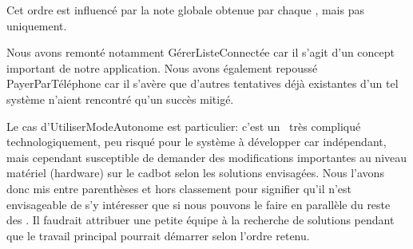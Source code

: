 Cet ordre est influencé par la note globale obtenue par chaque \cu, mais pas uniquement. 
\par
Nous avons remonté notamment GérerListeConnectée car il s'agit d'un concept important de notre application. 
Nous avons également repoussé PayerParTéléphone car il s'avère que d'autres tentatives déjà existantes d'un tel système n'aient rencontré qu'un succès mitigé.
\par
Le cas d'UtiliserModeAutonome est particulier: c'est un \cu\ très compliqué technologiquement, peu risqué pour le système à développer car indépendant, mais cependant susceptible de demander des modifications importantes au niveau matériel (hardware) sur le cadbot selon les solutions envisagées.
Nous l'avons donc mis entre parenthèses et hors classement pour signifier qu'il n'est envisageable de s'y intéresser que si nous pouvons le faire en parallèle du reste des \cu. 
Il faudrait attribuer une petite équipe à la recherche de solutions pendant que le travail principal pourrait démarrer selon l'ordre retenu.
